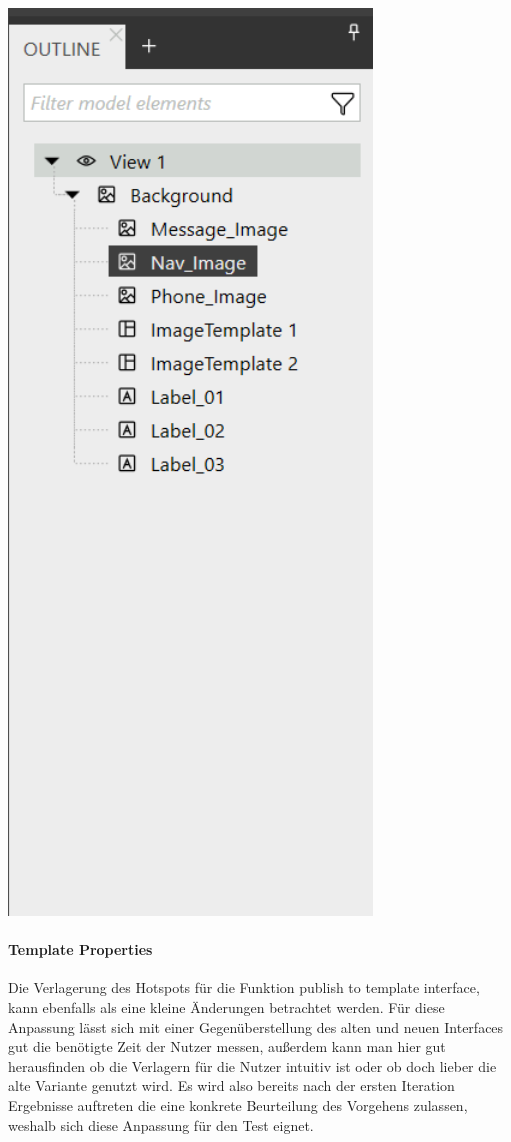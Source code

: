 \begin{center}
  \includegraphics[scale=0.8]{figures/Outline.png}
  \label{fig:Outline}
\end{center}

\paragraph{Template Properties}
Die Verlagerung des Hotspots für die Funktion publish to template interface, kann ebenfalls als eine kleine Änderungen betrachtet werden.
Für diese Anpassung lässt sich mit einer Gegenüberstellung des alten und neuen Interfaces gut die benötigte Zeit der Nutzer messen, außerdem kann man hier gut herausfinden ob die Verlagern für die Nutzer intuitiv ist oder ob doch lieber die alte Variante genutzt wird.
Es wird also bereits nach der ersten Iteration Ergebnisse auftreten die eine konkrete Beurteilung des Vorgehens zulassen, weshalb sich diese Anpassung für den Test eignet.

